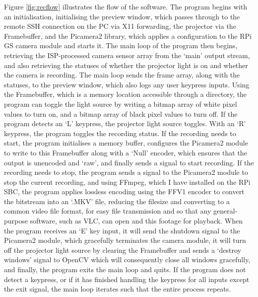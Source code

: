 Figure \ref{fig:recflow} illustrates the flow of the software. The program begins with an initialisation, initialising the preview window, which passes through to the remote SSH connection on the PC via X11 forwarding, the projector via the Framebuffer, and the Picamera2 library, which applies a configuration to the RPi GS camera module and starts it. The main loop of the program then begins, retrieving the ISP-processed camera sensor array from the `main' output stream, and also retrieving the statuses of whether the projector light is on and whether the camera is recording. The main loop sends the frame array, along with the statuses, to the preview window, which also logs any user keypress inputs. Using the Framebuffer, which is a memory location accessible through a directory, the program can toggle the light source by writing a bitmap array of white pixel values to turn on, and a bitmap array of black pixel values to turn off. If the program detects an `L' keypress, the projector light source toggles. With an `R' keypress, the program toggles the recording status. If the recording needs to start, the program initialises a memory buffer, configures the Picamera2 module to write to this Framebuffer along with a `Null' encoder, which ensures that the output is unencoded and `raw', and finally sends a signal to start recording. If the recording needs to stop, the program sends a signal to the Picamera2 module to stop the current recording, and using FFmpeg, which I have installed on the RPi SBC, the program applies lossless encoding using the FFV1 encoder to convert the bitstream into an `.MKV' file, reducing the filesize and converting to a common video file format, for easy file transmission and so that any general-purpose software, such as VLC, can open and this footage for playback. When the program receives an `E' key input, it will send the shutdown signal to the Picamera2 module, which gracefully terminates the camera module, it will turn off the projector light source by clearing the Framebuffer and sends a `destroy windows' signal to OpenCV which will consequently close all windows gracefully, and finally, the program exits the main loop and quits. If the program does not detect a keypress, or if it has finished handling the keypress for all inputs except the exit signal, the main loop iterates such that the entire process repeats.

